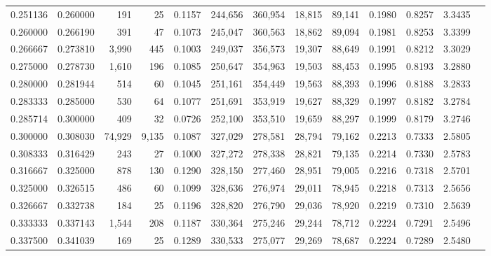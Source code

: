 \begin{tabular}{rrrrrrrrrrrrr}
0.251136 & 0.260000 &    191 &     25 &                                     0.1157 & 244,656 & 360,954 &  18,815 &  89,141 & 0.1980 & 0.8257 & 3.3435 \\
0.260000 & 0.266190 &    391 &     47 &                                     0.1073 & 245,047 & 360,563 &  18,862 &  89,094 & 0.1981 & 0.8253 & 3.3399 \\
0.266667 & 0.273810 &  3,990 &    445 &                                     0.1003 & 249,037 & 356,573 &  19,307 &  88,649 & 0.1991 & 0.8212 & 3.3029 \\
0.275000 & 0.278730 &  1,610 &    196 &                                     0.1085 & 250,647 & 354,963 &  19,503 &  88,453 & 0.1995 & 0.8193 & 3.2880 \\
0.280000 & 0.281944 &    514 &     60 &                                     0.1045 & 251,161 & 354,449 &  19,563 &  88,393 & 0.1996 & 0.8188 & 3.2833 \\
0.283333 & 0.285000 &    530 &     64 &                                     0.1077 & 251,691 & 353,919 &  19,627 &  88,329 & 0.1997 & 0.8182 & 3.2784 \\
0.285714 & 0.300000 &    409 &     32 &                                     0.0726 & 252,100 & 353,510 &  19,659 &  88,297 & 0.1999 & 0.8179 & 3.2746 \\
0.300000 & 0.308030 & 74,929 &  9,135 &                                     0.1087 & 327,029 & 278,581 &  28,794 &  79,162 & 0.2213 & 0.7333 & 2.5805 \\
0.308333 & 0.316429 &    243 &     27 &                                     0.1000 & 327,272 & 278,338 &  28,821 &  79,135 & 0.2214 & 0.7330 & 2.5783 \\
0.316667 & 0.325000 &    878 &    130 &                                     0.1290 & 328,150 & 277,460 &  28,951 &  79,005 & 0.2216 & 0.7318 & 2.5701 \\
0.325000 & 0.326515 &    486 &     60 &                                     0.1099 & 328,636 & 276,974 &  29,011 &  78,945 & 0.2218 & 0.7313 & 2.5656 \\
0.326667 & 0.332738 &    184 &     25 &                                     0.1196 & 328,820 & 276,790 &  29,036 &  78,920 & 0.2219 & 0.7310 & 2.5639 \\
0.333333 & 0.337143 &  1,544 &    208 &                                     0.1187 & 330,364 & 275,246 &  29,244 &  78,712 & 0.2224 & 0.7291 & 2.5496 \\
0.337500 & 0.341039 &    169 &     25 &                                     0.1289 & 330,533 & 275,077 &  29,269 &  78,687 & 0.2224 & 0.7289 & 2.5480 \\

\end{tabular}
